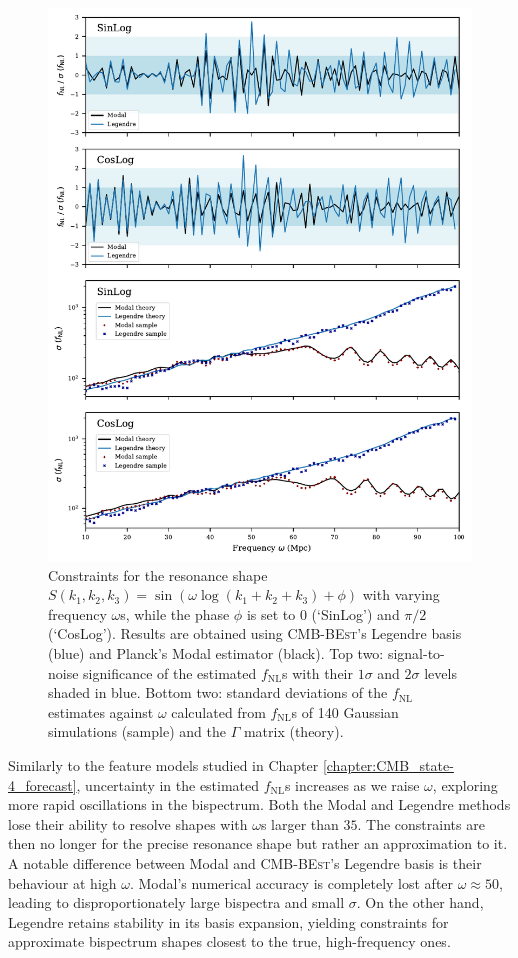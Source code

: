 \begin{figure}[htbp!] 
	\centering    
	\includegraphics{sinlog_template_frequency_Legendre_Modal.pdf}
	\caption{Constraints for the resonance shape $S(k_1,k_2,k_3) = \sin(\omega \log(k_1 + k_2 + k_3 ) + \phi)$ with varying frequency $\omega$s, while the phase $\phi$ is set to $0$ (`SinLog') and $\pi/2$ (`CosLog'). Results are obtained using \textsc{CMB-BEst}'s Legendre basis (blue) and Planck's Modal estimator (black). Top two: signal-to-noise significance of the estimated $f_\text{NL}$s with their $1\sigma$ and $2\sigma$ levels shaded in blue. Bottom two: standard deviations of the $f_\text{NL}$ estimates against $\omega$ calculated from $f_\text{NL}$s of 140 Gaussian simulations (sample) and the $\Gamma$ matrix (theory).}
	\label{fig:sinlog_template_frequency_Legendre_Modal}
\end{figure}

Similarly to the feature models studied in Chapter \ref{chapter:CMB_state-4_forecast}, uncertainty in the estimated $f_\text{NL}$s increases as we raise $\omega$, exploring more rapid oscillations in the bispectrum. Both the Modal and Legendre methods lose their ability to resolve shapes with $\omega$s larger than $35$. The constraints are then no longer for the precise resonance shape but rather an approximation to it. A notable difference between Modal and \textsc{CMB-BEst}'s Legendre basis is their behaviour at high $\omega$. Modal's numerical accuracy is completely lost after $\omega\approx 50$, leading to disproportionately large bispectra and small $\sigma$. On the other hand, Legendre retains stability in its basis expansion, yielding constraints for approximate bispectrum shapes closest to the true, high-frequency ones.

